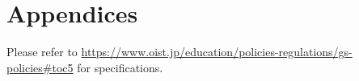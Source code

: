 

\chapter{Appendices} \label{appA}

Please refer to \url{https://www.oist.jp/education/policies-regulations/gs-policies#toc5} for specifications.
